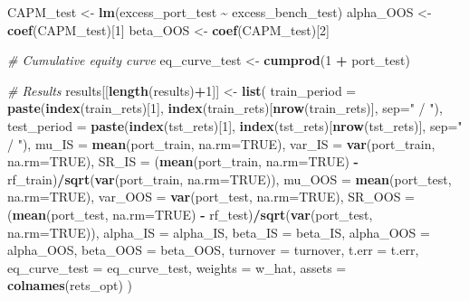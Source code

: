 \documentclass[
  12pt,
]{article}
\newenvironment{Shaded}{\begin{snugshade}}{\end{snugshade}}
\newcommand{\AttributeTok}[1]{\textcolor[rgb]{0.13,0.29,0.53}{#1}}
\newcommand{\CommentTok}[1]{\textcolor[rgb]{0.56,0.35,0.01}{\textit{#1}}}
\newcommand{\ConstantTok}[1]{\textcolor[rgb]{0.56,0.35,0.01}{#1}}
\newcommand{\DecValTok}[1]{\textcolor[rgb]{0.00,0.00,0.81}{#1}}
\newcommand{\FunctionTok}[1]{\textcolor[rgb]{0.13,0.29,0.53}{\textbf{#1}}}
\newcommand{\NormalTok}[1]{#1}
\newcommand{\OtherTok}[1]{\textcolor[rgb]{0.56,0.35,0.01}{#1}}
\newcommand{\SpecialCharTok}[1]{\textcolor[rgb]{0.81,0.36,0.00}{\textbf{#1}}}
\newcommand{\StringTok}[1]{\textcolor[rgb]{0.31,0.60,0.02}{#1}}
\begin{document}
\begin{Shaded}
\begin{Highlighting}[]
\NormalTok{CAPM\_test }\OtherTok{\textless{}{-}} \FunctionTok{lm}\NormalTok{(excess\_port\_test }\SpecialCharTok{\textasciitilde{}}\NormalTok{ excess\_bench\_test)}
\NormalTok{alpha\_OOS }\OtherTok{\textless{}{-}} \FunctionTok{coef}\NormalTok{(CAPM\_test)[}\DecValTok{1}\NormalTok{]}
\NormalTok{beta\_OOS  }\OtherTok{\textless{}{-}} \FunctionTok{coef}\NormalTok{(CAPM\_test)[}\DecValTok{2}\NormalTok{]}
  
  \CommentTok{\# Cumulative equity curve }
\NormalTok{eq\_curve\_test }\OtherTok{\textless{}{-}} \FunctionTok{cumprod}\NormalTok{(}\DecValTok{1} \SpecialCharTok{+}\NormalTok{ port\_test)}
  
  \CommentTok{\# Results}
\NormalTok{  results[[}\FunctionTok{length}\NormalTok{(results)}\SpecialCharTok{+}\DecValTok{1}\NormalTok{]] }\OtherTok{\textless{}{-}} \FunctionTok{list}\NormalTok{(}
  \AttributeTok{train\_period =} \FunctionTok{paste}\NormalTok{(}\FunctionTok{index}\NormalTok{(train\_rets)[}\DecValTok{1}\NormalTok{], }\FunctionTok{index}\NormalTok{(train\_rets)[}\FunctionTok{nrow}\NormalTok{(train\_rets)], }\AttributeTok{sep=}\StringTok{" / "}\NormalTok{),}
  \AttributeTok{test\_period  =} \FunctionTok{paste}\NormalTok{(}\FunctionTok{index}\NormalTok{(tst\_rets)[}\DecValTok{1}\NormalTok{], }\FunctionTok{index}\NormalTok{(tst\_rets)[}\FunctionTok{nrow}\NormalTok{(tst\_rets)], }\AttributeTok{sep=}\StringTok{" / "}\NormalTok{),}
  \AttributeTok{mu\_IS =} \FunctionTok{mean}\NormalTok{(port\_train, }\AttributeTok{na.rm=}\ConstantTok{TRUE}\NormalTok{),}
  \AttributeTok{var\_IS =} \FunctionTok{var}\NormalTok{(port\_train, }\AttributeTok{na.rm=}\ConstantTok{TRUE}\NormalTok{),}
  \AttributeTok{SR\_IS =}\NormalTok{ (}\FunctionTok{mean}\NormalTok{(port\_train, }\AttributeTok{na.rm=}\ConstantTok{TRUE}\NormalTok{) }\SpecialCharTok{{-}}\NormalTok{ rf\_train)}\SpecialCharTok{/}\FunctionTok{sqrt}\NormalTok{(}\FunctionTok{var}\NormalTok{(port\_train, }\AttributeTok{na.rm=}\ConstantTok{TRUE}\NormalTok{)),}
  \AttributeTok{mu\_OOS =} \FunctionTok{mean}\NormalTok{(port\_test, }\AttributeTok{na.rm=}\ConstantTok{TRUE}\NormalTok{),}
  \AttributeTok{var\_OOS =} \FunctionTok{var}\NormalTok{(port\_test, }\AttributeTok{na.rm=}\ConstantTok{TRUE}\NormalTok{),}
  \AttributeTok{SR\_OOS =}\NormalTok{ (}\FunctionTok{mean}\NormalTok{(port\_test, }\AttributeTok{na.rm=}\ConstantTok{TRUE}\NormalTok{) }\SpecialCharTok{{-}}\NormalTok{ rf\_test)}\SpecialCharTok{/}\FunctionTok{sqrt}\NormalTok{(}\FunctionTok{var}\NormalTok{(port\_test, }\AttributeTok{na.rm=}\ConstantTok{TRUE}\NormalTok{)),}
  \AttributeTok{alpha\_IS =}\NormalTok{ alpha\_IS,}
  \AttributeTok{beta\_IS =}\NormalTok{ beta\_IS,}
  \AttributeTok{alpha\_OOS =}\NormalTok{ alpha\_OOS,}
  \AttributeTok{beta\_OOS =}\NormalTok{ beta\_OOS,}
  \AttributeTok{turnover =}\NormalTok{ turnover,}
  \AttributeTok{t.err =}\NormalTok{ t.err,   }
  \AttributeTok{eq\_curve\_test =}\NormalTok{ eq\_curve\_test,}
  \AttributeTok{weights =}\NormalTok{ w\_hat,}
  \AttributeTok{assets  =} \FunctionTok{colnames}\NormalTok{(rets\_opt)}
\NormalTok{)}


\end{Highlighting}
\end{Shaded}
\end{document}
